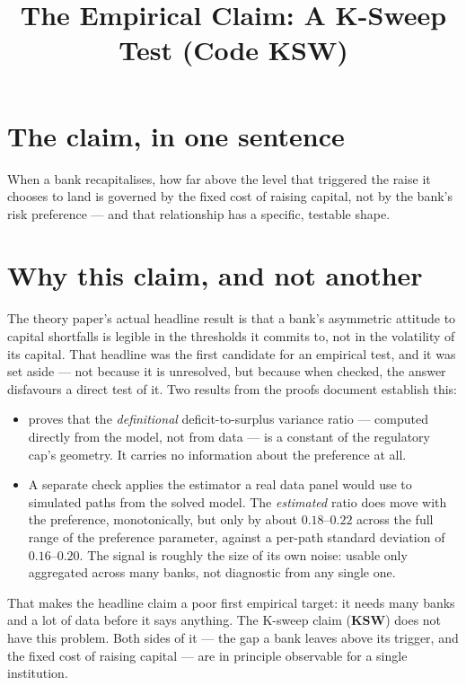 \documentclass[11pt]{article}
\title{The Empirical Claim: A K-Sweep Test (Code KSW)}
\date{}
\begin{document}
\maketitle
\thispagestyle{empty}

\section{The claim, in one sentence}

When a bank recapitalises, how far above the level that triggered the
raise it chooses to land is governed by the fixed cost of raising
capital, not by the bank's risk preference --- and that relationship has
a specific, testable shape.

\section{Why this claim, and not another}

The theory paper's actual headline result is that a bank's asymmetric
attitude to capital shortfalls is legible in the thresholds it commits
to, not in the volatility of its capital. That headline was the first
candidate for an empirical test, and it was set aside --- not because it
is unresolved, but because when checked, the answer disfavours a direct
test of it. Two results from the proofs document establish this:

\begin{itemize}
\item[\textbf{SCG}] proves that the \emph{definitional} deficit-to-surplus
  variance ratio --- computed directly from the model, not from data --- is
  a constant of the regulatory cap's geometry. It carries no information
  about the preference at all.
\item A separate check applies the estimator a real data panel would use
  to simulated paths from the solved model. The \emph{estimated} ratio
  does move with the preference, monotonically, but only by about
  $0.18$--$0.22$ across the full range of the preference parameter,
  against a per-path standard deviation of $0.16$--$0.20$. The signal is
  roughly the size of its own noise: usable only aggregated across many
  banks, not diagnostic from any single one.
\end{itemize}

\noindent That makes the headline claim a poor first empirical target: it
needs many banks and a lot of data before it says anything. The K-sweep
claim (\textbf{KSW}) does not have this problem. Both sides of it --- the
gap a bank leaves above its trigger, and the fixed cost of raising
capital --- are in principle observable for a single institution.
\end{document}
